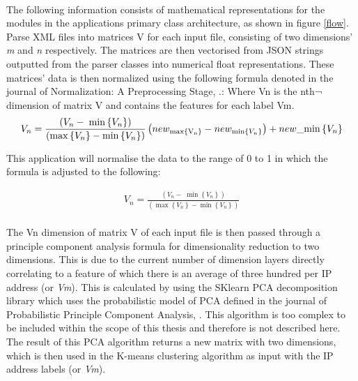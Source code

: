 \paragraph{}The following information consists of mathematical representations for the modules in the applications primary class architecture, as shown in figure \ref{flow}.
Parse XML files into matrices V for each input file, consisting of two dimensions' \textit{m} and \textit{n} respectively. The matrices are then vectorised from JSON strings outputted from the parser classes into numerical float representations.
These matrices' data is then normalized using the following formula denoted in the journal of Normalization: A Preprocessing Stage, \cite{normalization}.:
Where Vn is the nth¬ dimension of matrix V and contains the features for each label Vm.
\begin{align*}
{V_n} = \frac{{({V_n} - \;\min \left\{ {{V_n}} \right\})}}{{\left( {\max \left\{ {{V_n}} \right\} - \min \left\{ {{V_n}} \right\}} \right)}}\left( {ne{w_{\max \left\{ {{{\rm{V}}_{\rm{n}}}} \right\}}} - ne{w_{{\rm{min}}\left\{ {{V_n}} \right\}}}} \right) + new\_{\rm{min}}\left\{ {{V_n}} \right\}
\end{align*}

This application will normalise the data to the range of 0 to 1 in which the formula is adjusted to the following:

\begin{align*}
{V_n} = \frac{{({V_n} - \;\min \left\{ {{V_n}} \right\})}}{{\left( {\max \left\{ {{V_n}} \right\} - \min \left\{ {{V_n}} \right\}} \right)}}
\end{align*}

\paragraph{}The Vn dimension of matrix V of each input file is then passed through a principle component analysis formula for dimensionality reduction to two dimensions. This is due to the current number of dimension layers directly correlating to a feature of which there is an average of three hundred per IP address (or \textit{Vm}). This is calculated by using the SKlearn PCA decomposition library which uses the probabilistic model of PCA defined in the journal of Probabilistic Principle Component Analysis, \cite{probabilityPCA}. This algorithm is too complex to be included within the scope of this thesis and therefore is not described here. The result of this PCA algorithm returns a new matrix with two dimensions, which is then used in the K-means clustering algorithm as input with the IP address labels (or \textit{Vm}).

